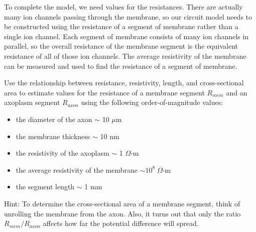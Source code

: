 \par 
To complete the model, we need values for the resistances.
There are actually many ion channels passing through the membrane, so our circuit model needs to be constructed using the resistance of a segment of membrane rather  than a single ion channel.
Each segment of membrane consists of many ion channels in parallel, so the overall resistance of the membrane segment is the equivalent resistance of all of those ion channels. 
The average resistivity of the membrane can be measured and used to find the resistance of a segment of membrane.
\par 
Use the relationship between resistance, resistivity, length, and cross-sectional area to estimate values for the resistance of a membrane segment $R_{mem}$ and an axoplasm segment $R_{axon}$ using the following order-of-magnitude values:
\begin{itemize}
\item the diameter of the axon $\sim$ 10 $\mu$m
\item the membrane thickness $\sim$ 10 nm
\item the resistivity of the axoplasm $\sim$ 1 $\Omega$-m
\item the average resistivity of the membrane $\sim  10^{8} \; \Omega$-m
\item the segment length $\sim$ 1 mm
\end{itemize}
Hint: To determine the cross-sectional area of a membrane segment, think of unrolling the membrane from the axon.
Also, it turns out that only the ratio $R_{mem}/R_{axon}$ affects how far the potential difference will spread.

